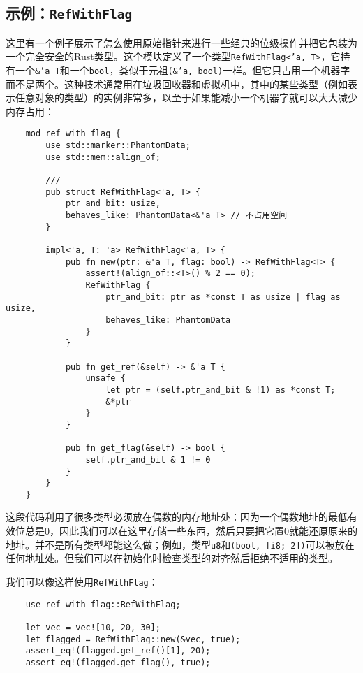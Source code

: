 \subsection{示例：\texttt{RefWithFlag}}\label{RefWithFlag}
这里有一个例子展示了怎么使用原始指针来进行一些经典的位级操作并把它包装为一个完全安全的Rust类型。这个模块定义了一个类型\texttt{RefWithFlag<'a, T>}，它持有一个\texttt{\&'a T}和一个\texttt{bool}，类似于元祖\texttt{(\&'a, bool)}一样。但它只占用一个机器字而不是两个。这种技术通常用在垃圾回收器和虚拟机中，其中的某些类型（例如表示任意对象的类型）的实例非常多，以至于如果能减小一个机器字就可以大大减少内存占用：
\begin{verbatim}
    mod ref_with_flag {
        use std::marker::PhantomData;
        use std::mem::align_of;

        ///
        pub struct RefWithFlag<'a, T> {
            ptr_and_bit: usize,
            behaves_like: PhantomData<&'a T> // 不占用空间
        }

        impl<'a, T: 'a> RefWithFlag<'a, T> {
            pub fn new(ptr: &'a T, flag: bool) -> RefWithFlag<T> {
                assert!(align_of::<T>() % 2 == 0);
                RefWithFlag {
                    ptr_and_bit: ptr as *const T as usize | flag as usize,
                    behaves_like: PhantomData
                }
            }

            pub fn get_ref(&self) -> &'a T {
                unsafe {
                    let ptr = (self.ptr_and_bit & !1) as *const T;
                    &*ptr
                }
            }

            pub fn get_flag(&self) -> bool {
                self.ptr_and_bit & 1 != 0
            }
        }
    }
\end{verbatim}

这段代码利用了很多类型必须放在偶数的内存地址处：因为一个偶数地址的最低有效位总是0，因此我们可以在这里存储一些东西，然后只要把它置0就能还原原来的地址。并不是所有类型都能这么做；例如，类型\texttt{u8}和\texttt{(bool, [i8; 2])}可以被放在任何地址处。但我们可以在初始化时检查类型的对齐然后拒绝不适用的类型。

我们可以像这样使用\texttt{RefWithFlag}：
\begin{verbatim}
    use ref_with_flag::RefWithFlag;

    let vec = vec![10, 20, 30];
    let flagged = RefWithFlag::new(&vec, true);
    assert_eq!(flagged.get_ref()[1], 20);
    assert_eq!(flagged.get_flag(), true);
\end{verbatim}

